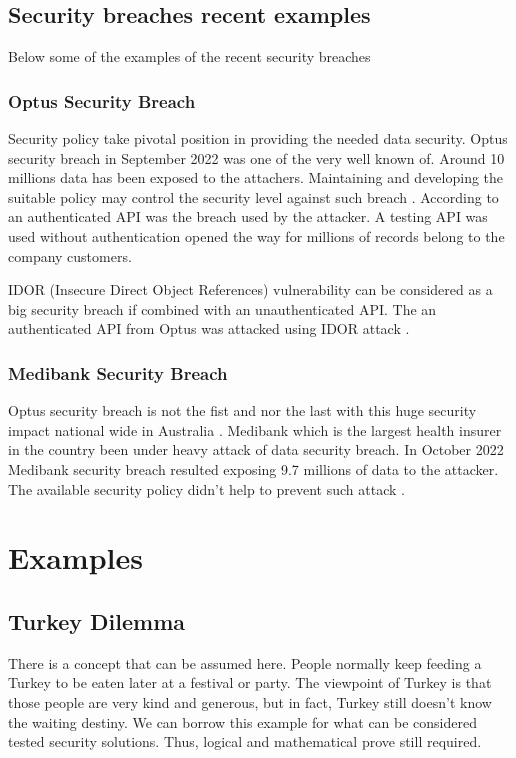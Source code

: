 \documentclass[journal]{IEEEtran}
\begin{document}
\subsection{Security breaches recent examples}
Below some of the examples of the recent security breaches

\subsubsection{Optus Security Breach}
Security policy take pivotal position in providing the needed data security.
Optus security breach in September 2022 was one of the very well known of.
Around 10 millions data has been exposed to the attachers. Maintaining
and developing the suitable policy may control the security level
against such breach \cite{biddle2022data}\cite{biddle2022p}.
According to \cite{paul2022}\cite{john2022} an authenticated API was
the breach used by the attacker. A testing API was used without
authentication opened the way for millions of records belong to the company customers.

IDOR (Insecure Direct Object References) vulnerability can be considered as a big security
breach if combined with an unauthenticated API. The an authenticated API from Optus was attacked
using IDOR attack \cite{james2022}.

\subsubsection{Medibank Security Breach}
Optus security breach is not the fist and nor the last with this huge security impact national
wide in Australia \cite{medibank2022}\cite{maurice2023}. Medibank which is the largest health
insurer in the country been under heavy attack of data security breach. In October 2022 Medibank
security breach resulted exposing 9.7 millions of data to the attacker. The available security policy
didn't help to prevent such attack \cite{biddle2022p}.

\section{Examples}

\subsection*{Turkey Dilemma}
There is a concept that can be assumed here. People normally keep feeding a Turkey to be eaten later at
a festival or party. The viewpoint of Turkey is that those people are very kind and generous, but in fact,
Turkey still doesn't know the waiting destiny. We can borrow this example for what can be considered tested
security solutions. Thus, logical and mathematical prove still required.
\end{document}
